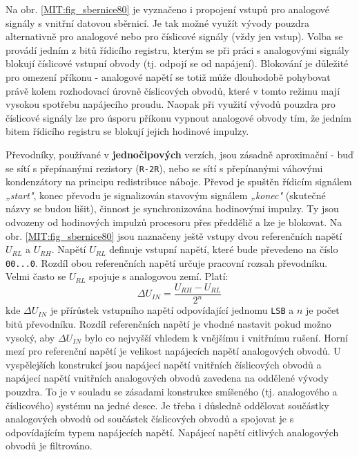       Na obr. \ref{MIT:fig_sbernice80} je vyznačeno i propojení vstupů pro analogové signály s 
      vnitřní  datovou sběrnicí. Je tak možné využít vývody pouzdra alternativně pro analogové nebo 
      pro číslicové signály (vždy jen vstup). Volba se provádí jedním z bitů řídicího registru, 
      kterým se při práci s analogovými signály blokují číslicové vstupní obvody (tj. odpojí se od 
      napájení). Blokování je důležité pro omezení příkonu - analogové napětí se totiž může 
      dlouhodobě pohybovat právě kolem rozhodovací úrovně číslicových obvodů, které v tomto režimu 
      mají vysokou spotřebu napájecího proudu. Naopak při využití vývodů pouzdra pro číslicové 
      signály lze pro úsporu příkonu vypnout analogové obvody tím, že jedním bitem řídicího 
      registru se blokují jejich hodinové impulzy.
      
      Převodníky, používané v \textbf{jednočipových} verzích, jsou zásadně aproximační - buď se 
      sítí s přepínanými rezistory (\texttt{R-2R}), nebo se sítí s přepínanými váhovými 
      kondenzátory na principu redistribuce náboje. Převod je spuštěn řídicím signálem 
      \emph{„start"}, konec převodu je signalizován stavovým signálem \emph{„konec"} (skutečné 
      názvy se budou lišit), činnost je synchronizována hodinovými impulzy. Ty jsou odvozeny od 
      hodinových impulzů procesoru přes předdělič a lze je blokovat. Na obr.    
      \ref{MIT:fig_sbernice80} jsou naznačeny ještě vstupy dvou referenčních napětí \(U_{RL}\) a 
      \(U_{RH}\). Napětí \(U_{RL}\) definuje vstupní napětí, které bude převedeno na číslo 
      \texttt{00...0}. Rozdíl obou referenčních napětí určuje pracovní rozsah převodníku. Velmi 
      často se \(U_{RL}\) spojuje s analogovou zemí. Platí:
      \begin{equation}
        \Delta U_{IN} = \frac{U_{RH} - U_{RL}}{2^n}
      \end{equation}
      kde \(\Delta U_{IN}\) je přírůstek vstupního napětí odpovídající jednomu \texttt{LSB} a \(n\) 
      je počet bitů převodníku. Rozdíl referenčních napětí je vhodné nastavit pokud možno vysoký, 
      aby \(\Delta U_{IN}\) bylo co nejvyšší vhledem k vnějšímu i vnitřnímu rušení. Horní mezí pro 
      referenční napětí je velikost napájecích napětí analogových obvodů. U vyspělejších konstrukcí 
      jsou napájecí napětí vnitřních číslicových obvodů a napájecí napětí vnitřních analogových 
      obvodů zavedena na oddělené vývody pouzdra. To je v souladu se zásadami konstrukce smíšeného 
      (tj. analogového a číslicového) systému na jedné  desce. Je třeba i důsledně oddělovat 
      součástky analogových obvodů od součástek číslicových obvodů a spojovat je s odpovídajícím 
      typem napájecích napětí. Napájecí napětí citlivých analogových obvodů je filtrováno.
      
